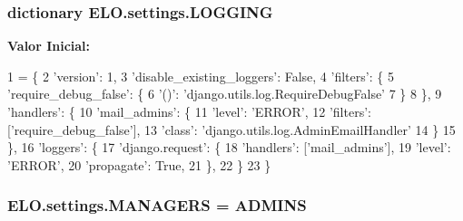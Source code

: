 \hypertarget{namespaceELO_1_1settings_addc421e02af1569796e2d33b2bc62ff5}{
\subsubsection[{L\-O\-G\-G\-I\-N\-G}]{\setlength{\rightskip}{0pt plus 5cm}dictionary E\-L\-O.\-settings.\-L\-O\-G\-G\-I\-N\-G}}\label{namespaceELO_1_1settings_addc421e02af1569796e2d33b2bc62ff5}
{\bfseries Valor Inicial\-:}
\begin{DoxyCode}
1 = \{
2     \textcolor{stringliteral}{'version'}: 1,
3     \textcolor{stringliteral}{'disable\_existing\_loggers'}: \textcolor{keyword}{False},
4     \textcolor{stringliteral}{'filters'}: \{
5         \textcolor{stringliteral}{'require\_debug\_false'}: \{
6             \textcolor{stringliteral}{'()'}: \textcolor{stringliteral}{'django.utils.log.RequireDebugFalse'}
7         \}
8     \},
9     \textcolor{stringliteral}{'handlers'}: \{
10         \textcolor{stringliteral}{'mail\_admins'}: \{
11             \textcolor{stringliteral}{'level'}: \textcolor{stringliteral}{'ERROR'},
12             \textcolor{stringliteral}{'filters'}: [\textcolor{stringliteral}{'require\_debug\_false'}],
13             \textcolor{stringliteral}{'class'}: \textcolor{stringliteral}{'django.utils.log.AdminEmailHandler'}
14         \}
15     \},
16     \textcolor{stringliteral}{'loggers'}: \{
17         \textcolor{stringliteral}{'django.request'}: \{
18             \textcolor{stringliteral}{'handlers'}: [\textcolor{stringliteral}{'mail\_admins'}],
19             \textcolor{stringliteral}{'level'}: \textcolor{stringliteral}{'ERROR'},
20             \textcolor{stringliteral}{'propagate'}: \textcolor{keyword}{True},
21         \},
22     \}
23 \}
\end{DoxyCode}
\hypertarget{namespaceELO_1_1settings_a43e8826e0b24e337065b4975f3eace4c}{
\subsubsection[{M\-A\-N\-A\-G\-E\-R\-S}]{\setlength{\rightskip}{0pt plus 5cm}E\-L\-O.\-settings.\-M\-A\-N\-A\-G\-E\-R\-S = {\bf A\-D\-M\-I\-N\-S}}}\label{namespaceELO_1_1settings_a43e8826e0b24e337065b4975f3eace4c}
